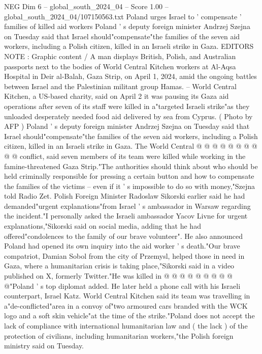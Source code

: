 \begin{textsample}{NEG Dim 6 – global\_south\_2024\_04 – Score 1.00 – global\_south\_2024\_04/107150563.txt}  \label{ex:f6_neg_332}
Poland urges Israel to ' compensate ' families of killed aid workers Poland ' s deputy foreign minister Andrzej Szejna on Tuesday said that Israel should"compensate"the families of the seven aid workers, including a Polish citizen, killed in an Israeli strike in Gaza.
EDITORS NOTE : Graphic content / A man displays British, Polish, and Australian passports next to the bodies of World Central Kitchen workers at Al-Aqsa Hospital in Deir al-Balah, Gaza Strip, on April 1, 2024, amid the ongoing battles between Israel and the Palestinian militant group Hamas. -- World Central Kitchen, a US-based charity, said on April 2 it was pausing its Gaza aid operations after seven of its staff were killed in a"targeted Israeli strike"as they unloaded desperately needed food aid delivered by sea from Cyprus. ( Photo by AFP ) Poland ' s deputy foreign minister Andrzej Szejna on Tuesday said that Israel should"compensate"the families of the seven aid workers, including a Polish citizen, killed in an Israeli strike in Gaza.
The World Central @ @ @ @ @ @ @ @ @ @ conflict, said seven members of its team were killed while working in the famine-threatened Gaza Strip."The authorities should think about who should be held criminally responsible for pressing a certain button and how to compensate the families of the victims -- even if it ' s impossible to do so with money,"Szejna told Radio Zet.
Polish Foreign Minister Radoslaw Sikorski earlier said he had demanded"urgent explanations"from Israel ' s ambassador in Warsaw regarding the incident."I personally asked the Israeli ambassador Yacov Livne for urgent explanations,"Sikorski said on social media, adding that he had offered"condolences to the family of our brave volunteer".
He also announced Poland had opened its own inquiry into the aid worker ' s death."Our brave compatriot, Damian Sobol from the city of Przemysl, helped those in need in Gaza, where a humanitarian crisis is taking place,"Sikorski said in a video published on X, formerly Twitter."He was killed in @ @ @ @ @ @ @ @ @ @"Poland ' s top diplomat added.
He later held a phone call with his Israeli counterpart, Israel Katz.
World Central Kitchen said its team was travelling in a"de-conflicted"area in a convoy of"two armoured cars branded with the WCK logo and a soft skin vehicle"at the time of the strike."Poland does not accept the lack of compliance with international humanitarian law and ( the lack ) of the protection of civilians, including humanitarian workers,"the Polish foreign ministry said on Tuesday.

\end{textsample}
